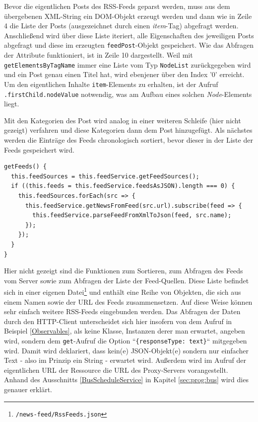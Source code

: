 Bevor die eigentlichen Posts des RSS-Feeds geparst werden, muss aus dem übergebenen \acs{XML}-String ein \acs{DOM}-Objekt erzeugt werden und dann wie in Zeile 4 die Liste der Posts (ausgezeichnet durch einen \textit{item}-Tag) abgefragt werden. Anschließend wird über diese Liste iteriert, alle Eigenschaften des jeweiligen Posts abgefragt und diese im erzeugten \texttt{feedPost}-Objekt gespeichert. Wie das Abfragen der Attribute funktioniert, ist in Zeile 10 dargestellt. Weil mit \texttt{getElementsByTagName} immer eine Liste vom Typ \texttt{NodeList} zurückgegeben wird und ein Post genau einen Titel hat, wird ebenjener über den Index '0' erreicht. Um den eigentlichen Inhalte \texttt{item}-Elements zu erhalten, ist der Aufruf \texttt{.firstChild.nodeValue} notwendig, was am Aufbau eines solchen \textit{Node}-Elements liegt.

Mit den Kategorien des Post wird analog in einer weiteren Schleife (hier nicht gezeigt) verfahren und diese Kategorien dann dem Post hinzugefügt. Als nächstes werden die Einträge des Feeds chronologisch sortiert, bevor dieser in der Liste der Feeds gespeichert wird.

\begin{lstlisting}[float, floatplacement=h, style=htmlcssjs, caption={Abfragen der Feeds im \texttt{NewsFeedComponent}}, label={NewsFeedComponent}]
getFeeds() {
  this.feedSources = this.feedService.getFeedSources();
  if ((this.feeds = this.feedService.feedsAsJSON).length === 0) {
    this.feedSources.forEach(src => {
      this.feedService.getNewsFromFeed(src.url).subscribe(feed => {
        this.feedService.parseFeedFromXmlToJson(feed, src.name);
      });
    });
  }
}
\end{lstlisting}
Hier nicht gezeigt sind die Funktionen zum Sortieren, zum Abfragen des Feeds vom Server sowie zum Abfragen der Liste der Feed-Quellen. Diese Liste befindet sich in einer eigenen Datei\footnote{\texttt{/news-feed/RssFeeds.json}} und enthält eine Reihe von Objekten, die sich aus einem Namen sowie der URL des Feeds zusammensetzen. Auf diese Weise können sehr einfach weitere RSS-Feeds eingebunden werden. Das Abfragen der Daten durch den \acs{HTTP}-Client unterscheidet sich hier insofern von dem Aufruf in Beispiel \ref{Observables}, als keine Klasse, Instanzen derer man erwartet, angeben wird, sondern dem \texttt{get}-Aufruf die Option ``\texttt{\{responseType: \textquotesingle text\textquotesingle \}}`` mitgegeben wird. Damit wird deklariert, dass kein(e) \acs{JSON}-Objekt(e) sondern nur einfacher Text - also im Prinzip ein String - erwartet wird. Außerdem wird im Aufruf der eigentlichen \acs{URL} der Ressource die \acs{URL} des Proxy-Servers vorangestellt. Anhand des Ausschnitts \ref{BusScheduleService} in Kapitel \ref{sec:prog:bus} wird dies genauer erklärt.

